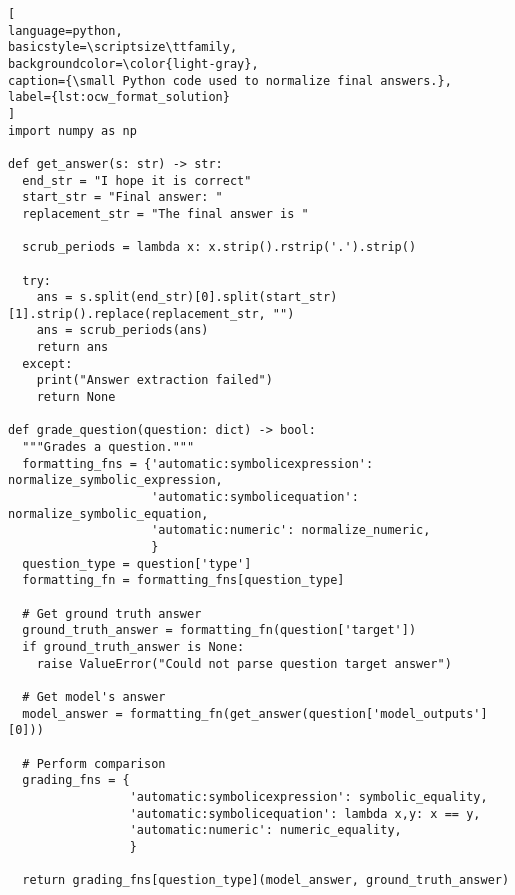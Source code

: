 \documentclass{article}
\begin{document}
\newpage
\begin{lstlisting}[
language=python,
basicstyle=\scriptsize\ttfamily,
backgroundcolor=\color{light-gray},
caption={\small Python code used to normalize final answers.},
label={lst:ocw_format_solution}
]
import numpy as np

def get_answer(s: str) -> str:
  end_str = "I hope it is correct"
  start_str = "Final answer: "
  replacement_str = "The final answer is "

  scrub_periods = lambda x: x.strip().rstrip('.').strip()

  try:
    ans = s.split(end_str)[0].split(start_str)[1].strip().replace(replacement_str, "") 
    ans = scrub_periods(ans)
    return ans 
  except:
    print("Answer extraction failed")
    return None

def grade_question(question: dict) -> bool:
  """Grades a question."""
  formatting_fns = {'automatic:symbolicexpression': normalize_symbolic_expression,
                    'automatic:symbolicequation': normalize_symbolic_equation,
                    'automatic:numeric': normalize_numeric,
                    }
  question_type = question['type']
  formatting_fn = formatting_fns[question_type]

  # Get ground truth answer
  ground_truth_answer = formatting_fn(question['target'])
  if ground_truth_answer is None:
    raise ValueError("Could not parse question target answer")

  # Get model's answer
  model_answer = formatting_fn(get_answer(question['model_outputs'][0]))

  # Perform comparison
  grading_fns = {
                 'automatic:symbolicexpression': symbolic_equality,
                 'automatic:symbolicequation': lambda x,y: x == y,
                 'automatic:numeric': numeric_equality,
                 }

  return grading_fns[question_type](model_answer, ground_truth_answer)
  

\end{lstlisting}
\end{document}
